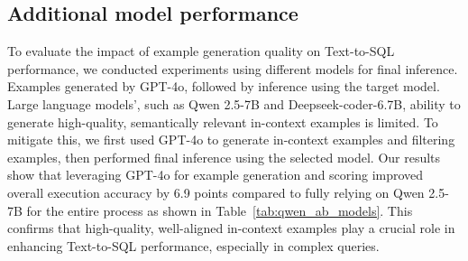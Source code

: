 \subsection{Additional model performance} 
To evaluate the impact of example generation quality on Text-to-SQL performance, we conducted experiments using different models for final inference. Examples generated by GPT-4o, followed by inference using the target model. Large language models', such as Qwen 2.5-7B and Deepseek-coder-6.7B, ability to generate high-quality, semantically relevant in-context examples is limited. To mitigate this, we first used GPT-4o to generate in-context examples and filtering examples, then performed final inference using the selected model. Our results show that leveraging GPT-4o for example generation and scoring improved overall execution accuracy by 6.9 points compared to fully relying on Qwen 2.5-7B for the entire process as shown in Table~\ref{tab:qwen_ab_models}. This confirms that high-quality, well-aligned in-context examples play a crucial role in enhancing Text-to-SQL performance, especially in complex queries.